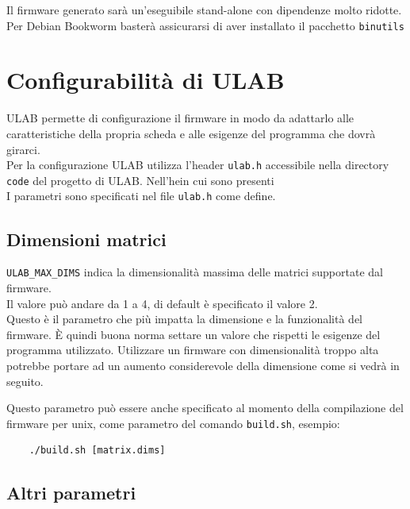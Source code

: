 \documentclass[12pt,a4paper]{report}
\begin{document}
Il firmware generato sarà un'eseguibile stand-alone con
dipendenze molto ridotte. Per Debian Bookworm basterà assicurarsi di
aver installato il pacchetto \texttt{binutils}

\section{Configurabilità di ULAB}

ULAB permette di configurazione il firmware in modo da adattarlo alle
caratteristiche della propria scheda e alle esigenze del programma che
dovrà girarci.\\
Per la configurazione ULAB utilizza l'header
\texttt{ulab.h} accessibile nella directory \texttt{code} del progetto
di ULAB. Nell'hein cui sono presenti\\
I parametri sono specificati nel file \texttt{ulab.h} come define.

\subsection{Dimensioni matrici}\label{dimensioni-matrici}

\texttt{ULAB\_MAX\_DIMS} indica la dimensionalità massima delle matrici
supportate dal firmware.\\
Il valore può andare da 1 a 4, di default è specificato il valore 2.\\
Questo è il parametro che più impatta la dimensione e la funzionalità
del firmware. È quindi buona norma settare un valore che rispetti le
esigenze del programma utilizzato. Utilizzare un firmware con
dimensionalità troppo alta potrebbe portare ad un aumento considerevole
della dimensione come si vedrà in seguito.

Questo parametro può essere anche specificato al momento della
compilazione del firmware per unix, come parametro del comando
\texttt{build.sh}, esempio:

\begin{verbatim}
    ./build.sh [matrix.dims]
\end{verbatim}

\subsection{Altri parametri}\label{altri-parametri}
\end{document}
